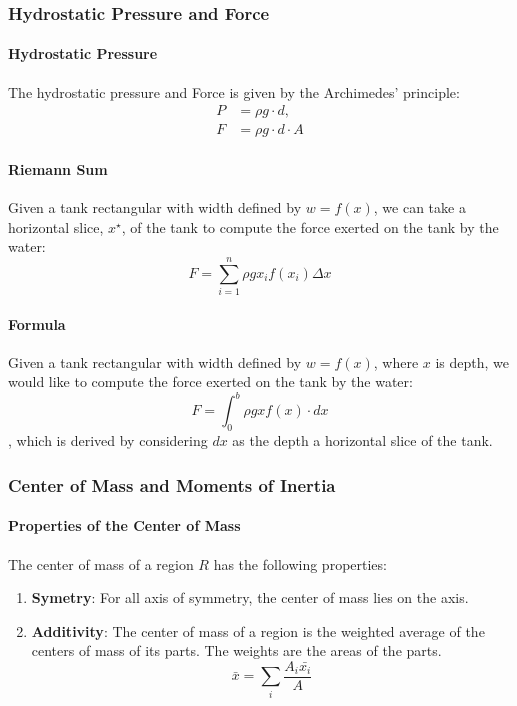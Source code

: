 \documentclass[11pt]{article}
\begin{document}
\subsubsection{Hydrostatic Pressure and Force}
\paragraph{Hydrostatic Pressure} The hydrostatic pressure and Force is given by the Archimedes' principle:
\begin{subequations}
    \begin{align}
        P &= \rho g \cdot d, \\
        F &= \rho g \cdot d \cdot A
    \end{align}
\end{subequations}
\paragraph{Riemann Sum} Given a tank rectangular with width defined by $w = f(x)$, we can take a horizontal slice, $x^\star$, of the tank to compute the force exerted on the tank by the water:
\begin{equation}
    F =\sum_{i=1}^n \rho g x_i f(x_i) \Delta x
\end{equation}
\paragraph{Formula} Given a tank rectangular with width defined by $w = f(x)$, where $x$ is depth, we would like to compute the force exerted on the tank by the water:
\begin{equation}
    F = \int_0^b \rho g x f(x) \cdot dx
\end{equation}
, which is derived by considering $dx$ as the depth a horizontal slice of the tank.
\subsubsection{Center of Mass and Moments of Inertia}
\paragraph{Properties of the Center of Mass} The center of mass of a region $R$ has the following properties:
\begin{enumerate}
    \item \textbf{Symetry}: For all axis of symmetry, the center of mass lies on the axis.
    \item \textbf{Additivity}: The center of mass of a region is the weighted average of the centers of mass of its parts. The weights are the areas of the parts.
    \begin{equation}
        \bar{x} = \sum_i \frac{A_i\bar{x_i}}{A}
    \end{equation}
\end{enumerate}
\end{document}
